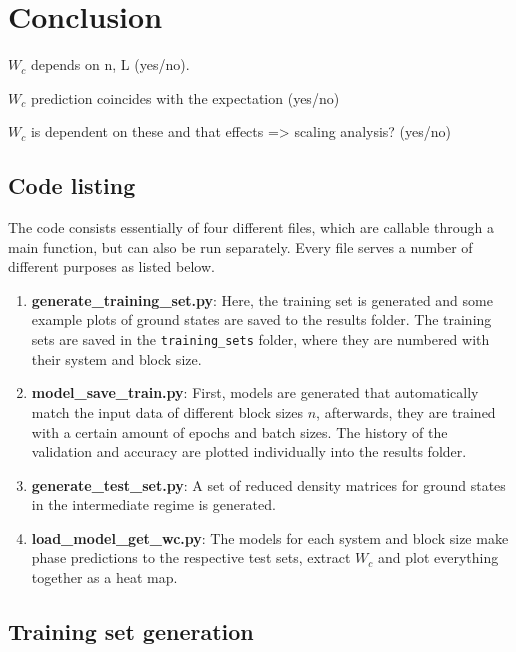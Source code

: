 \documentclass[reprint,amsmath,amssymb,aps,prb]{revtex4-2}
\begin{document}
\section{Conclusion}%

$W_c$ depends on n, L (yes/no).

$W_c$ prediction coincides with the expectation (yes/no)

$W_c$ is dependent on these and that effects => scaling analysis? (yes/no)



\newpage
\appendix


\begin{widetext}
\section{Code listing} \label{app:codes}
The code consists essentially of four different files, which are callable through a main function, but can also be run separately. Every file serves a number of different purposes as listed below.

\begin{enumerate}
	\item \textbf{generate\_training\_set.py}: Here, the training set is generated and some example plots of ground states are saved to the results folder. The training sets are saved in the \texttt{training\_sets} folder, where they are numbered with their system and block size.
	\item \textbf{model\_save\_train.py}: First, models are generated that automatically match the input data of different block sizes $n$, afterwards, they are trained with a certain amount of epochs and batch sizes. The history of the validation and accuracy are plotted individually into the results folder.
	\item \textbf{generate\_test\_set.py}: A set of reduced density matrices for ground states in the intermediate regime is generated.
	\item \textbf{load\_model\_get\_wc.py}: The models for each system and block size make phase predictions to the respective test sets, extract $W_c$ and plot everything together as a heat map.
\end{enumerate}

\subsection{Training set generation}



\end{widetext}
\end{document}
